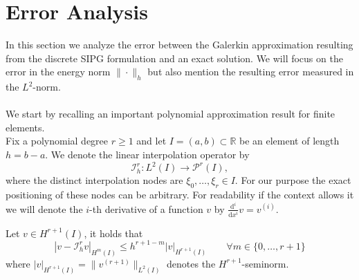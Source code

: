 \section{Error Analysis}
In this section we analyze the error between the Galerkin approximation resulting from the discrete SIPG formulation and an exact solution. 
We will focus on the error in the energy norm $\| \cdot \|_{h}$ but also mention the resulting error measured in the $L^2$-norm.
\\ \\
We start by recalling an important polynomial approximation result for finite elements. \\
Fix a polynomial degree $r \geq 1$ and let $I = (a, b) \subset \mathbb{R}$ be an element of length $h = b-a$. We denote the linear interpolation operator by
\begin{equation}
	\mathcal{I}_h^r : L^2(I) \to \mathcal{P}^r(I),
\end{equation}
where the distinct interpolation nodes are $\xi_0,\ldots,\xi_r \in I$. For our purpose the exact positioning of these nodes can be arbitrary. 
For readability if the context allows it we will denote the $i$-th derivative of a function $v$ by $\frac{\text{d}^i}{\text{d} x^i} v = v^{(i)}$.
\begin{lemma}
	\label{lemma:interp_estimate}
	Let $v \in H^{r+1}(I)$, it holds that 
	\begin{equation*}
		| v - \mathcal{I}_h^r v |_{H^m(I)} \leq  h^{r+1-m} |v|_{H^{r+1}(I)} \qquad \forall m \in \{0,\ldots,r+1\}
	\end{equation*} 
	where $|v|_{H^{r+1}(I)} = \| v^{({r+1})} \|_{L^2(I)}$ denotes the $H^{r+1}$-seminorm. \\ 
\end{lemma}
